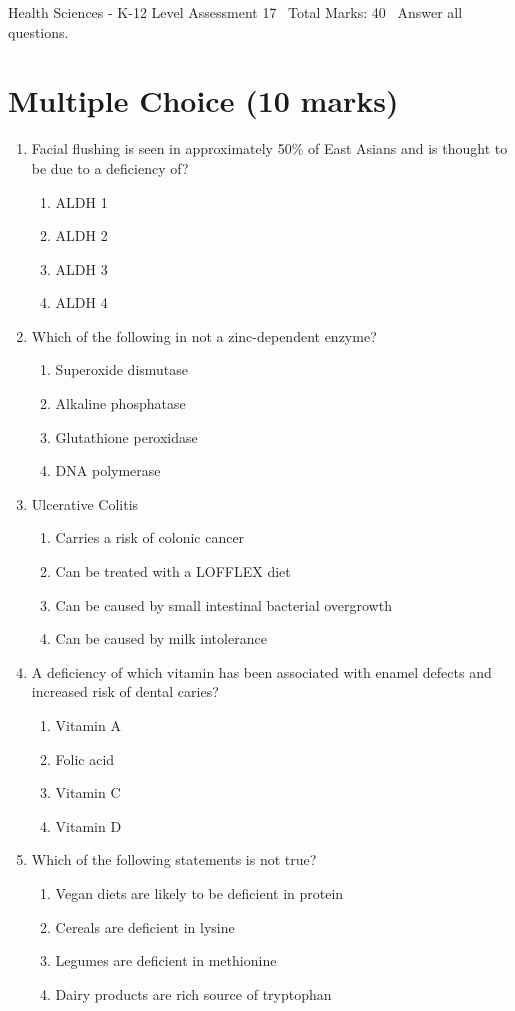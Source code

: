 \documentclass[12pt]{article}
\begin{document}
\begin{center}
Health Sciences - K-12 Level Assessment 17 \
Total Marks: 40 \
Answer all questions.
\end{center}

\section*{Multiple Choice (10 marks)}
\begin{enumerate}[label=\arabic*.]
\item Facial flushing is seen in approximately 50\% of East Asians and is thought to be due to a deficiency of?
\begin{enumerate}[label=(\alph*)]
    \item ALDH 1
    \item ALDH 2
    \item ALDH 3
    \item ALDH 4
\end{enumerate}
\item Which of the following in not a zinc-dependent enzyme?
\begin{enumerate}[label=(\alph*)]
    \item Superoxide dismutase
    \item Alkaline phosphatase
    \item Glutathione peroxidase
    \item DNA polymerase
\end{enumerate}
\item Ulcerative Colitis
\begin{enumerate}[label=(\alph*)]
    \item Carries a risk of colonic cancer
    \item Can be treated with a LOFFLEX diet
    \item Can be caused by small intestinal bacterial overgrowth
    \item Can be caused by milk intolerance
\end{enumerate}
\item A deficiency of which vitamin has been associated with enamel defects and increased risk of dental caries?
\begin{enumerate}[label=(\alph*)]
    \item Vitamin A
    \item Folic acid
    \item Vitamin C
    \item Vitamin D
\end{enumerate}
\item Which of the following statements is not true?
\begin{enumerate}[label=(\alph*)]
    \item Vegan diets are likely to be deficient in protein
    \item Cereals are deficient in lysine
    \item Legumes are deficient in methionine
    \item Dairy products are rich source of tryptophan
\end{enumerate}
\end{enumerate}
\end{document}
